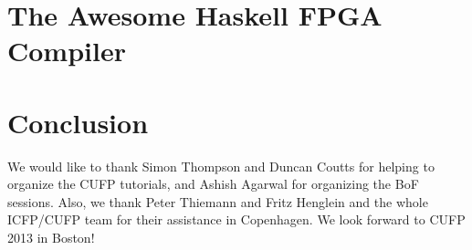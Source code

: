 \documentclass{jfp1}
\begin{document}
\section{The Awesome Haskell FPGA Compiler}

\section{Conclusion}

We would like to thank Simon Thompson and Duncan Coutts for helping to
organize the CUFP tutorials, and Ashish Agarwal for organizing the BoF
sessions.  Also, we thank Peter Thiemann and Fritz Henglein and the
whole ICFP/CUFP team for their assistance in Copenhagen.  We look
forward to CUFP 2013 in Boston!


\end{document}
